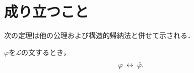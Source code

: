 \section{成り立つこと}
	次の定理は他の公理および構造的帰納法と併せて示される．
	
	\begin{screen}
		\begin{thm}[書き換えの同値性]
			$\varphi$を$\mathcal{L}$の文するとき，
			\begin{align}
				\varphi \hspace{0.25em}\leftrightarrow\hspace{0.25em} \hat{\varphi}.
			\end{align}
		\end{thm}
	\end{screen}